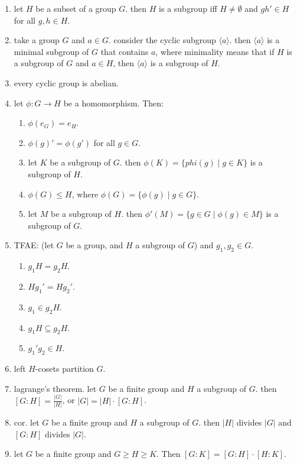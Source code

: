 \begin{enumerate}
\begin{enumerate}
	\end{enumerate}
	\item let $H$ be a subset of a group $G$. then $H$ is a subgroup iff $H \neq \emptyset$ and $gh' \in H$ for all $g,h \in H$. 
	\item take a group $G$ and $a \in G$. consider the cyclic subgroup $\langle a \rangle$. then $\langle a \rangle$ is a minimal subgroup of $G$ that contains $a$, where minimality means that if $H$ is a subgroup of $G$ and $a \in H$, then $\langle a \rangle$ is a subgroup of $H$. 
	\item every cyclic group is abelian. 
	\item let $\phi: G \to H$ be a homomorphism. Then: 
	\begin{enumerate}
		\item $\phi(e_G) = e_H$. 
		\item $\phi(g)' = \phi(g')$ for all $g \in G$. 
		\item let $K$ be a subgroup of $G$. then $\phi(K) = \{phi(g) \mid g \in K\}$ is a subgroup of $H$. 
		\item $\phi(G) \leq H$, where $\phi(G) = \{\phi(g) \mid g \in G\}$. 
		\item let $M$ be a subgroup of $H$. then $\phi'(M) = \{g \in G \mid \phi(g) \in M\}$ is a subgroup of $G$. 
	\end{enumerate}
	\item TFAE: (let $G$ be a group, and $H$ a subgroup of $G$) and $g_1,g_2 \in G$. 
	\begin{enumerate}
		\item $g_1H = g_2H$. 
		\item $Hg_1' = Hg_2'$. 
		\item $g_1 \in g_2H$. 
		\item $g_1H \subseteq g_2H$. 
		\item $g_1'g_2 \in H$. 
	\end{enumerate}
	\item left $H$-cosets partition $G$. 
	\item lagrange's theorem. let $G$ be a finite group and $H$ a subgroup of $G$. then $[G:H] = \frac{|G|}{|H|}$, or $|G| = |H| \cdot [G:H]$. 
	\item cor. let $G$ be a finite group and $H$ a subgroup of $G$. then $|H|$ divides $|G|$ and $[G:H]$ divides $|G|$. 
	\item let $G$ be a finite group and $G \geq H \geq K$. Then $[G:K] = [G:H] \cdot [H:K]$. 
\end{enumerate}


